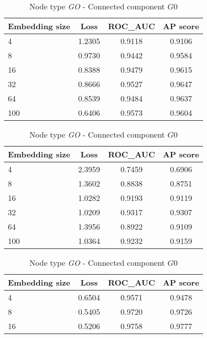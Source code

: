 \begin{table}[h]
    \centering
    
    \begin{subtable}[t]{\textwidth}
        \centering
        \begin{tabular}{lccc}        
            \toprule
            \textbf{Embedding size} & \textbf{Loss} & \textbf{ROC\_AUC} & \textbf{AP score} \\
            \midrule
            4 & 1.2305 & 0.9118 & 0.9106 \\
            8 & 0.9730 & 0.9442 & 0.9584 \\
            16 & 0.8388 & 0.9479 & 0.9615 \\
            32 & 0.8666 & 0.9527 & 0.9647 \\
            64 & 0.8539 & 0.9484 & 0.9637 \\
            100 & 0.6406 & 0.9573 & 0.9604 \\
            \bottomrule
        \end{tabular}
        \caption{Node type \textit{Disease}}
    \end{subtable}
    
    \vspace{1em}
    
    \begin{subtable}[t]{\textwidth}
        \centering
        \begin{tabular}{lccc}        
            \toprule
            \textbf{Embedding size} & \textbf{Loss} & \textbf{ROC\_AUC} & \textbf{AP score} \\
            \midrule
            4 & 2.3959 & 0.7459 & 0.6906 \\
            8 & 1.3602 & 0.8838 & 0.8751 \\
            16 & 1.0282 & 0.9193 & 0.9119 \\
            32 & 1.0209 & 0.9317 & 0.9307 \\
            64 & 1.3956 & 0.8922 & 0.9109 \\
            100 & 1.0364 & 0.9232 & 0.9159 \\
            \bottomrule
        \end{tabular}
        \caption{Node type \textit{Genomic feature}}
    \end{subtable}
    
    \vspace{1em}
    
    \begin{subtable}[t]{\textwidth}
        \centering
        \begin{tabular}{lccc}        
            \toprule
            \textbf{Embedding size} & \textbf{Loss} & \textbf{ROC\_AUC} & \textbf{AP score} \\
            \midrule
            4 & 0.6504 & 0.9571 & 0.9478 \\
            8 & 0.5405 & 0.9720 & 0.9726 \\
            16 & 0.5206 & 0.9758 & 0.9777 \\
            \bottomrule
        \end{tabular}
        \caption{Node type \textit{GO} - Connected component $G0$}
    \end{subtable}
    

\end{table}

